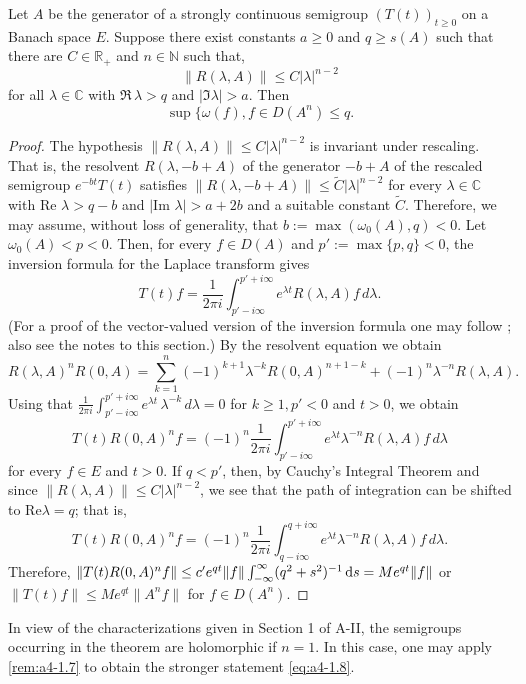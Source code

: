 \begin{theorem}\label{thm:a4-1.9} Let $A$ be the generator of a strongly continuous semigroup $(T(t))_{t \geq 0}$ on a Banach space $E$. 
Suppose there exist constants $a \geq 0$ and $q \geq s(A)$ such that there are $C \in \mathbb{R}_+$ and $n \in \mathbb{N}$ such that, 
    \[
    \| R(\lambda, A) \| \leq C | \lambda |^{n-2}
    \]
    for all $\lambda \in \mathbb{C}$ with $\Re\,\lambda > q$ and $| \Im \lambda | > a$. 
    Then
    \[
    \sup \{ \omega(f),  f \in D(A^n)  \leq q.\]
\end{theorem}

\begin{proof} The hypothesis $\| R(\lambda, A) \| \leq C | \lambda |^{n-2}$ is invariant under rescaling. 
That is, the resolvent $R(\lambda, -b+A)$ of the generator $-b+A$ of the rescaled semigroup $e^{-bt} T(t)$ satisfies  
$\| R(\lambda, -b+A) \| \leq \tilde{C} | \lambda |^{n-2}$ for every $\lambda \in \mathbb{C}$ with $\text{Re } \lambda > q-b$ and $| \text{Im } \lambda | > a+2b$ and a suitable constant $\tilde{C}$. 
Therefore, we may assume, without loss of generality, that $b := \max(\omega_0(A), q) < 0$. 
Let $\omega_0(A) < p < 0$. 
Then, for every $f \in D(A)$ and $p' := \max\{p, q\} < 0$, the inversion formula for the Laplace transform gives 
\begin{equation} \label{eq:a4-1.12}
T(t) f = \frac{1}{2\pi i} \int_{p' - i\infty}^{p' + i\infty} e^{\lambda t} R(\lambda, A) f \, d\lambda.
\end{equation}
 (For a proof of the vector-valued version of the inversion formula one may follow \citet[p.66]{widder:1946}; also see the notes to this section.)
By the resolvent equation we obtain 
   \[ R(\lambda, A)^n R(0, A) = \sum_{k=1}^{n} (-1)^{k+1} \lambda^{-k} R(0, A)^{n+1-k} + (-1)^n \lambda^{-n} R(\lambda, A).
   \]
  Using that  
$ \frac {1}{2\pi i} \int_{p' - i\infty}^{p' + i\infty} e^{\lambda t} \, \lambda^{-k} \, d\lambda = 0 $ for $ k \geq 1, p' < 0 $ and $ t > 0$, we obtain
 \begin{equation}\label{eq:a4-1.13}
   T(t) R(0, A)^n f = (-1)^n \frac{1}{2\pi i} \int_{p' - i\infty}^{p' + i\infty} e^{\lambda t} \lambda^{-n} R(\lambda, A) f \, d\lambda
    \end{equation}
 for every $f \in E$ and $t > 0$.
 If $q < p'$, then, by Cauchy's Integral Theorem and since $\| R(\lambda, A) \| \leq C | \lambda |^{n-2}$, we see that the path of integration can be shifted to $\text{Re} \lambda = q$; 
 that is,
    \[
    T(t) R(0, A)^n f = (-1)^n \frac{1}{2\pi i} \int_{q - i\infty}^{q + i\infty} e^{\lambda t} \lambda^{-n} R(\lambda, A) f \, d\lambda.
    \]
Therefore,  
$
\| T(t) R(0,A)^n f \| \leq c' e^{q t} \| f \| \int_{-\infty}^{\infty} (q^2 + s^2)^{-1}\mathop{}\!\mathrm{d}{s} = M e^{q t} \| f \|$ 
or 
$
\| T(t) f \| \leq M e^{q t} \| A^n f \|$ for $f \in D(A^n)$.
\end{proof}
In view of the characterizations given in Section 1 of A-II, the semigroups occurring in the theorem are holomorphic if $ n = 1 $. 
In this case, one may apply \eqref{rem:a4-1.7} to obtain the stronger statement \eqref{eq:a4-1.8}.

